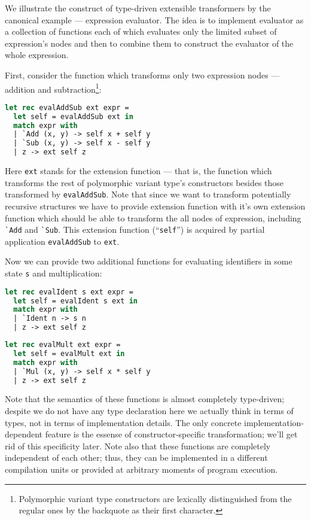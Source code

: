We illustrate the construct of type-driven extensible transformers by the canonical
example --- expression evaluator. The idea is to implement evaluator as a
collection of functions each of which evaluates only the limited subset of expression's
nodes and then to combine them to construct the evaluator of the whole expression.

First, consider the function which transforms only two expression nodes ---
addition and subtraction\footnote{Polymorphic variant type constructors are lexically distinguished
from the regular ones by the backquote as their first character.}:

\begin{lstlisting}[language=ocaml]
let rec evalAddSub ext expr =
  let self = evalAddSub ext in
  match expr with
  | `Add (x, y) -> self x + self y
  | `Sub (x, y) -> self x - self y
  | z -> ext self z
\end{lstlisting}

Here \lstinline{ext} stands for the extension function --- that is, the function which
transforms the rest of polymorphic variant type's constructors besides those transformed 
by \lstinline{evalAddSub}. Note that since we want to transform potentially recursive 
structures we have to provide extension function with it's own extension function which 
should be able to transform the all nodes of expression, including \lstinline{`Add} and
\lstinline{`Sub}. This extension function (``\lstinline{self}'') is acquired by partial
application \lstinline{evalAddSub} to \lstinline{ext}.

Now we can provide two additional functions for evaluating identifiers in some state 
\lstinline{s} and multiplication:

\begin{lstlisting}[language=ocaml]
let rec evalIdent s ext expr =
  let self = evalIdent s ext in
  match expr with
  | `Ident n -> s n
  | z -> ext self z
\end{lstlisting}

\begin{lstlisting}[language=ocaml]
let rec evalMult ext expr =
  let self = evalMult ext in
  match expr with
  | `Mul (x, y) -> self x * self y
  | z -> ext self z
\end{lstlisting}

Note that the semantics of these functions is almost completely type-driven; despite
we do not have any type declaration here we actually think in terms of types, not
in terms of implementation details. The only concrete implementation-dependent feature
is the essense of constructor-specific transformation; we'll get rid of this specificity 
later. Note also that these functions are completely independent of each other; thus, they 
can be implemented in a different compilation units or provided at arbitrary moments of 
program execution.


